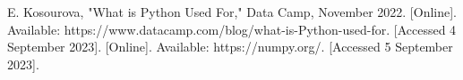 \documentclass[journal]{IEEEtran}
\begin{document}
\begin{thebibliography}{00}
 E. Kosourova, "What is Python Used For," Data Camp, November 2022. [Online]. Available: https://www.datacamp.com/blog/what-is-Python-used-for. [Accessed 4 September 2023].
 [Online]. Available: https://numpy.org/. [Accessed 5 September 2023].

\end{thebibliography}
\end{document}
